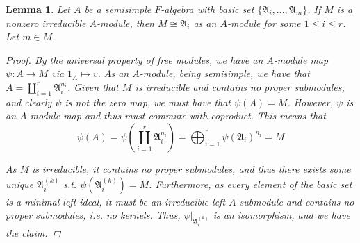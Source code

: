\documentclass{article}
\newtheorem{lemma}{Lemma}[section]
\begin{document}
\begin{lemma}
  
  Let $A$ be a semisimple $F$-algebra with basic set $\{\mathfrak{A}_{i},...,\mathfrak{A}_{m}\}$. If $M$ is a nonzero irreducible $A$-module, then $M \cong \mathfrak{A}_{i}$ as an $A$-module for some $1 \leq i \leq r$. Let $m \in M$.

\begin{proof}
  
    By the universal property of free modules, we have an $A$-module map $\psi: A \to M$ via $1_{A} \mapsto v$. As an $A$-module, being semisimple, we have that $A = \coprod_{i=1}^{r}\mathfrak{A}_{i}^{n_{i}}$. Given that $M$ is irreducible and contains no proper submodules, and clearly $\psi$ is not the zero map, we must have that $\psi(A) = M$. However, $\psi$ is an $A$-module map and thus must commute with coproduct. This means that
  \[
    \psi(A) = \psi\left(\coprod_{i=1}^{r}\mathfrak{A}_{i}^{n_{i}}\right) = \bigoplus_{i=1}^{r}\psi(\mathfrak{A}_{i})^{n_{i}} = M
  \]

  As M is irreducible, it contains no proper submodules, and thus there exists some unique $\mathfrak{A}_{i}^{(k)}$ s.t. $\psi(\mathfrak{A}_{i}^{(k)}) = M$. Furthermore, as every element of the basic set is a minimal left ideal, it must be an irreducible left $A$-submodule and contains no proper submodules, i.e. no kernels. Thus, $\psi|_{\mathfrak{A}_{i}^{(k)}}$ is an isomorphism, and we have the claim. \end{proof}
\end{lemma}
\end{document}
